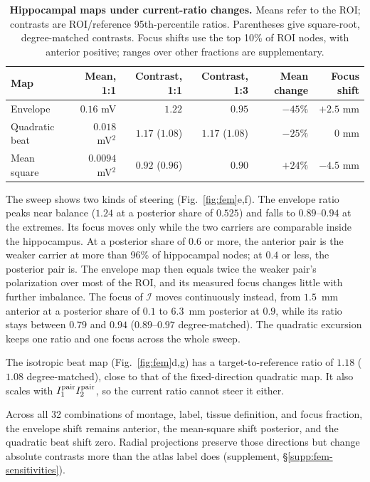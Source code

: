 \documentclass[11pt,a4paper]{article}
\newif\ifjne
\begin{document}
\begin{table}[htbp]
\centering\small
\caption{\textbf{Hippocampal maps under current-ratio changes.} Means refer to the
ROI; contrasts are ROI/reference 95th-percentile ratios. Parentheses give
square-root, degree-matched contrasts. Focus shifts use the top 10\% of ROI
nodes, with anterior positive; ranges over other fractions are supplementary.}
\label{tab:fem-summary}
\begin{tabular}{@{}lrrrrr@{}}
\toprule
Map & Mean, 1:1 & Contrast, 1:1 & Contrast, 1:3 & Mean change & Focus shift\\
\midrule
Envelope & $0.16$ mV & $1.22$ & $0.95$ & $-45\%$ & $+2.5$ mm\\
Quadratic beat & $0.018$ mV$^2$ & $1.17$ ($1.08$) & $1.17$ ($1.08$) & $-25\%$ & $0$ mm\\
Mean square & $0.0094$ mV$^2$ & $0.92$ ($0.96$) & $0.90$ & $+24\%$ & $-4.5$ mm\\
\bottomrule
\end{tabular}
\end{table}

The sweep shows two kinds of steering (Fig.~\ref{fig:fem}e,f). The envelope ratio peaks
near balance ($1.24$ at a posterior share of $0.525$) and falls to $0.89$--$0.94$ at
the extremes. Its focus moves only while the two carriers are comparable inside the
hippocampus. At a posterior share of $0.6$ or more, the anterior pair is the weaker
carrier at more than 96\% of hippocampal nodes; at $0.4$ or less, the posterior pair is. The
envelope map then equals twice the weaker pair's polarization over most of the ROI,
and its measured focus changes little with further imbalance. The focus of $\mathcal I$ moves
continuously instead, from $1.5$~mm anterior at a posterior share of $0.1$ to $6.3$~mm
posterior at $0.9$, while its ratio stays between $0.79$ and $0.94$ ($0.89$--$0.97$
degree-matched). The quadratic excursion keeps one ratio and one focus across the
whole sweep.

The isotropic beat map (Fig.~\ref{fig:fem}d,g) has a target-to-reference ratio of $1.18$
($1.08$ degree-matched), close to that of the fixed-direction quadratic map. It also
scales with $I_1^{\rm pair}I_2^{\rm pair}$, so the current ratio cannot steer it either.

Across all 32 combinations of montage, label, tissue definition, and focus
fraction, the envelope shift remains anterior, the mean-square shift posterior,
and the quadratic beat shift zero. Radial projections preserve those directions
but change absolute contrasts more than the atlas label does (supplement,
\S\ref{supp:fem-sensitivities}).
\ifjne\else
\end{document}
